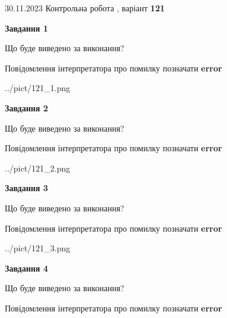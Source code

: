 \documentclass[12pt, ukrainian]{article}
\begin{document}
{{30.11.2023 Контрольна робота , варіант  \No \textbf { 121 }\par}}
{




{\begin {center}\textbf{Завдання 1}\end {center}}\par
Що буде виведено за виконання? \par
Повідомлення інтерпретатора про помилку позначати \textbf{error}

\begin{center}
	{../pict/121_1.png}
\end{center}
\newpage

{\begin {center}\textbf{Завдання 2}\end {center}}\par
Що буде виведено за виконання? \par
Повідомлення інтерпретатора про помилку позначати \textbf{error}

\begin{center}
	{../pict/121_2.png}
\end{center}
\newpage

{\begin {center}\textbf{Завдання 3}\end {center}}\par
Що буде виведено за виконання? \par
Повідомлення інтерпретатора про помилку позначати \textbf{error}

\begin{center}
	{../pict/121_3.png}
\end{center}
\newpage

{\begin {center}\textbf{Завдання 4}\end {center}}\par
Що буде виведено за виконання? \par
Повідомлення інтерпретатора про помилку позначати \textbf{error}

}
\end{document}
